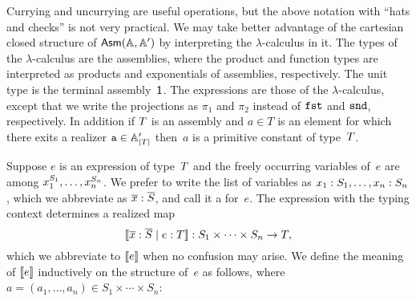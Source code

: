 Currying and uncurrying are useful operations, but the above notation
with ``hats and checks'' is not very practical. We may take better
advantage of the cartesian closed structure of $\mathsf{Asm}(\mathbb{A},\mathbb{A}')$ by interpreting
the $\lambda$-calculus in it. The types of the $\lambda$-calculus are
the assemblies, where the product and function types are interpreted
as products and exponentials of assemblies, respectively. The unit
type is the terminal assembly~$\mathsf{1}$. The expressions are those of the
$\lambda$-calculus, except that we write the projections as $\pi_1$
and $\pi_2$ instead of $\mathtt{fst}$ and $\mathtt{snd}$, respectively. In
addition if $T$ is an assembly and $a \in T$ is an element for
which there exits a realizer $\mathtt{a} \in \mathbb{A}'_{|T|}$ then~$a$ is a
primitive constant of type~$T$.

Suppose $e$ is an expression of type~$T$ and the freely
occurring variables of~$e$ are among $x_1^{S_1}, \ldots,
x_n^{S_n}$. We prefer to write the list of variables as
$x_1 : S_1, \ldots, x_n : S_n$, which we abbreviate as
$\overline{x} : \overline{S}$, and call it a  for~$e$. The expression with the typing context determines
a realized map
%
\begin{equation*}
  [\![\overline{x} : \overline{S} \mid e : T]\!] :
  S_1 \times \cdots \times S_n \to T,
\end{equation*}
%
which we abbreviate to $[\![e]\!]$ when no confusion may arise. We
define the meaning of $[\![e]\!]$ inductively on the structure of~$e$ as
follows, where $a = (a_1, \ldots, a_n) \in S_1 \times \cdots \times
S_n$:
%
